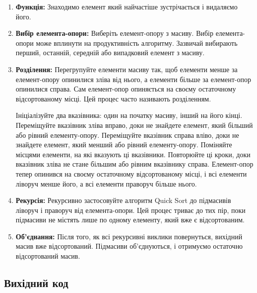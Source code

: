 \documentclass[12pt]{extarticle}
\begin{document}
\begin{enumerate}

\item \textbf{Функція:} Знаходимо елемент який найчастіше зустрічається і видаляємо його.

\item \textbf{Вибір елемента-опори:} Виберіть елемент-опору з масиву. Вибір елемента-опори може вплинути на продуктивність алгоритму. Зазвичай вибирають перший, останній, середній або випадковий елемент з масиву.
\item \textbf{Розділення:} Перегрупуйте елементи
 масиву так, щоб елементи менше за елемент-опору опинилися зліва від 
 нього, а елементи більше за елемент-опор опинилися справа. 
 Сам елемент-опор опиняється на своєму остаточному відсортованому місці. 
 Цей процес часто називають розділенням.

Ініціалізуйте два вказівника: один на початку масиву, інший на його кінці.
Переміщуйте вказівник зліва вправо, доки не знайдете елемент, який більший або рівний елементу-опору.
Переміщуйте вказівник справа вліво, доки не знайдете елемент, який менший або рівний елементу-опору.
Поміняйте місцями елементи, на які вказують ці вказівники.
Повторюйте ці кроки, доки вказівник зліва не стане більшим або рівним вказівнику справа. Елемент-опор тепер опинився на своєму остаточному відсортованому місці, і всі елементи ліворуч менше його, а всі елементи праворуч більше нього.
\item \textbf{Рекурсія:} Рекурсивно застосовуйте алгоритм 
Quick Sort до підмасивів ліворуч і праворуч від елемента-опори. 
Цей процес триває до тих пір, поки підмасиви не містять лише по 
одному елементу, який вже є відсортованим.
\item \textbf{Об'єднання:} Після того, як всі рекурсивні виклики повернуться, вихідний масив вже відсортований. Підмасиви об'єднуються, і отримуємо остаточно відсортований масив.

\end{enumerate}

\subsection*{Вихідний код}
\end{document}
